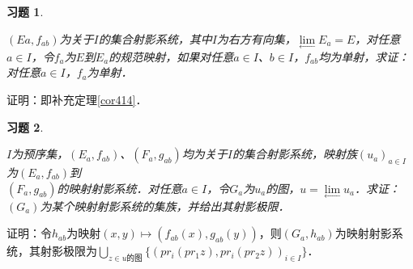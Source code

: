 \documentclass[12pt, a4paper, oneside]{book}
\newtheorem{exer}{习题}
\begin{document}
			\begin{exer}\label{exer190}
				\hfill\par
				$(Ea, f_{ab})$为关于$I$的集合射影系统，其中$I$为右方有向集，$\lim\limits_\gets E_a=E$，对任意$a\in I$，令$f_a$为$E$到$E_a$的规范映射，如果对任意$a\in I$、$b\in I$，$f_{ab}$均为单射，求证：对任意$a\in I$，$f_a$为单射．
			\end{exer}
			证明：即补充定理\ref{cor414}．
			
			\begin{exer}\label{exer191}
				\hfill\par
				$I$为预序集，$(E_a, f_{ab})$、$(F_a, g_{ab})$均为关于$I$的集合射影系统，映射族$(u_a)_{a\in I}$为$(E_a, f_{ab})$到\\$(F_a, g_{ab})$的映射射影系统．对任意$a\in I$，令$G_a$为$u_a$的图，$u=\lim\limits_\gets u_a$．求证：$(G_a)$为某个映射射影系统的集族，并给出其射影极限．
			\end{exer}
			证明：令$h_{ab}$为映射$(x, y)\mapsto (f_{ab}(x), g_{ab}(y))$，则$(G_a, h_{ab})$为映射射影系统，其射影极限为$\bigcup\limits_{z\in u\text{的图}}\{(pr_i(pr_1z), pr_i(pr_2z))_{i\in I}\}$．
			
\end{document}
